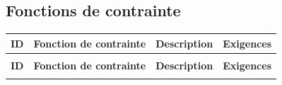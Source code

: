 \begin{landscape}
\newpage
\subsection{Fonctions de contrainte}

\label{tab:cahier-fc-v2}
\begin{longtable}{|>{\raggedright\arraybackslash}p{1.5cm}|p{4cm}|p{6cm}|p{8cm}|}
\toprule
\textbf{ID} & \textbf{Fonction de contrainte} & \textbf{Description} & \textbf{Exigences} \\
\midrule
\endfirsthead

\multicolumn{4}{c}{\tablename\ \thetable{} (suite)} \\
\toprule
\textbf{ID} & \textbf{Fonction de contrainte} & \textbf{Description} & \textbf{Exigences} \\
\midrule
\endhead

\bottomrule
\endfoot


\end{longtable}
\end{landscape}
